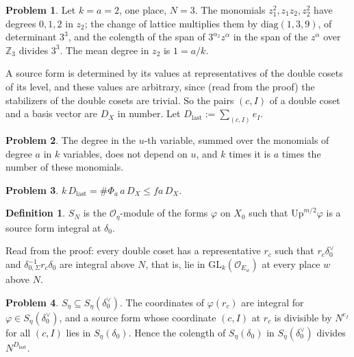 \documentclass[reqno]{amsart}
\theoremstyle{plain}
\theoremstyle{definition}
\newtheorem{problem}{Problem}[section]
\newtheorem{definition}[theorem]{Definition}
\theoremstyle{remark}
\newcommand{\Z}{{\mathbb{Z}}}
\newcommand{\Oc}{\mathcal O}
\newcommand{\Up}{\mathrm{Up}}
\newcommand{\Dl}{D_{\mathrm{last}}}
\begin{document}
\begin{problem}\label{pr:sym2}
Let \(k = a = 2\), one place, \(N = 3\).  The monomials \(z_1^2, z_1z_2, z_2^2\) have degrees \(0, 1, 2\) in \(z_2\); the change of lattice multiplies them by \(\mathrm{diag}(1, 3, 9)\), of determinant \(3^3\), and the colength of the span of \(3^{\alpha_2}z^\alpha\) in the span of the \(z^\alpha\) over \(\Z_3\) divides \(3^3\).  The mean degree in \(z_2\) is \(1 = a/k\).
\end{problem}

A source form is determined by its values at representatives of the double cosets of its level, and these values are arbitrary, since (read from the proof) the stabilizers of the double cosets are trivial.  So the pairs \((c, I)\) of a double coset and a basis vector are \(D_X\) in number.  Let \(\Dl := \sum_{(c, I)} e_I\).

\begin{problem}\label{pr:symmetry}
The degree in the \(u\)-th variable, summed over the monomials of degree \(a\) in \(k\) variables, does not depend on \(u\), and \(k\) times it is \(a\) times the number of these monomials.
\end{problem}

\begin{problem}\label{pr:degree}
\(k\,\Dl = \#\Phi_a\,a\,D_X \le fa\,D_X\).
\end{problem}

\begin{definition}\label{def:SN}
\(S_N\) is the \(\Oc_\eta\)-module of the forms \(\varphi\) on \(X_0\) such that \(\Up^{m/2}\varphi\) is a source form integral at \(\delta_0\).
\end{definition}

Read from the proof: every double coset has a representative \(r_c\) such that \(r_c\delta_0^\vee\) and \(\delta_{0,\Sigma}^{-1}r_c\delta_0\) are integral above \(N\), that is, lie in \(\mathrm{GL}_{k}(\Oc_{E_w})\) at every place \(w\) above \(N\).

\begin{problem}\label{pr:colength-model}
\(S_\eta \subseteq S_\eta(\delta_0^\vee)\).  The coordinates of \(\varphi(r_c)\) are integral for \(\varphi \in S_\eta(\delta_0^\vee)\), and a source form whose coordinate \((c, I)\) at \(r_c\) is divisible by \(N^{e_I}\) for all \((c, I)\) lies in \(S_\eta(\delta_0)\).  Hence the colength of \(S_\eta(\delta_0)\) in \(S_\eta(\delta_0^\vee)\) divides \(N^{\Dl}\).
\end{problem}
\end{document}
